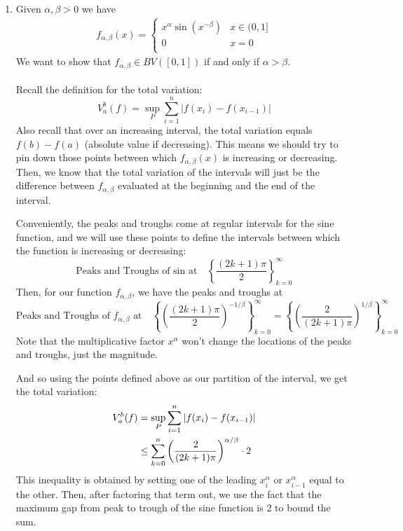 \documentclass[12pt]{article}
\theoremstyle{plain}
\theoremstyle{definition}
\theoremstyle{remark}
\begin{document}
\begin{enumerate}
\newpage
\item Given $\alpha, \beta >0$ we have
\begin{align*}
    f_{\alpha, \beta}(x) = 
        \begin{cases}
            x^\alpha \sin(x^{-\beta}) & x\in (0, 1] \\
            0 & x=0 \\
        \end{cases}
\end{align*}
We want to show that $f_{\alpha,\beta}\in BV([0,1])$ if and only if $\alpha>\beta$.
\\
\\
Recall the definition for the total variation:
\[
    V_a^b(f) = \sup_P \sum^n_{i=1} |f(x_{i}) - f(x_{i-1})|
\]
Also recall that over an increasing interval, the total variation equals $f(b)-f(a)$ (absolute value if decreasing). This means we should try to pin down those points between which $f_{\alpha, \beta}(x)$ is increasing or decreasing. Then, we know that the total variation of the intervals will just be the difference between $f_{\alpha,\beta}$ evaluated at the beginning and the end of the interval.

Conveniently, the peaks and troughs come at regular intervals for the sine function, and we will use these points to define the intervals between which the function is increasing or decreasing:
\[ 
    \text{Peaks and Troughs of sin at} \quad
    \left\{ \frac{(2k+1)\pi}{2} \right\}^\infty_{k=0} 
\]
Then, for our function $f_{\alpha,\beta}$, we have the peaks and troughs at 
\[ 
    \text{Peaks and Troughs of $f_{\alpha,\beta}$ at} \quad
    \left\{ \left(\frac{(2k+1)\pi}{2}\right)^{-1/\beta} 
    \right\}^\infty_{k=0}  =
    \left\{ \left(\frac{2}{(2k+1)\pi}\right)^{1/\beta} 
    \right\}^\infty_{k=0} 
\]
Note that the multiplicative factor $x^\alpha$ won't change the locations of the peaks and troughs, just the magnitude. 

And so using the points defined above as our partition of the interval, we get the total variation:
\begin{align}
    V_a^b(f) &= \sup_P \sum^n_{i=1} |f(x_i) - f(x_{i-1})|\notag\\
        &\leq \sum^n_{k=0} 
        \left(\frac{2}{(2k+1)\pi}\right)^{\alpha/\beta}
        \cdot 2
        \label{q2.pain}
\end{align}
This inequality is obtained by setting one of the leading $x_i^\alpha$ or $x_{i-1}^\alpha$ equal to the other. Then, after factoring that term out, we use the fact that the maximum gap from peak to trough of the sine function is 2 to bound the sum.


\end{enumerate}
\end{document}
